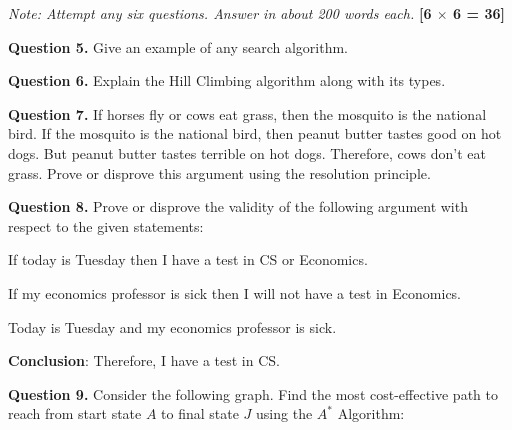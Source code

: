 \documentclass[11pt,a4paper]{article}
\begin{document}
\noindent   \textit{Note: Attempt any six questions. Answer in about 200 words each.} \hfill   \textbf{[6 $ \times$ 6 = 36]}

\medskip


\noindent   \textbf{Question 5.} Give an example of any search algorithm.

\medskip


\noindent   \textbf{Question 6.} Explain the Hill Climbing algorithm along with its types.

\medskip


\noindent   \textbf{Question 7.} If horses fly or cows eat grass, then the mosquito is the national bird. If the mosquito is the national bird, then peanut butter tastes good on hot dogs. But peanut butter tastes terrible on hot dogs. Therefore, cows don't eat grass. Prove or disprove this argument using the resolution principle.

\medskip


\noindent   \textbf{Question 8.} Prove or disprove the validity of the following argument with respect to the given statements:

\begin{parts}
  \item If today is Tuesday then I have a test in CS or Economics.
  \item If my economics professor is sick then I will not have a test in Economics.
  \item Today is Tuesday and my economics professor is sick.
  \item   \textbf{Conclusion}: Therefore, I have a test in CS.
\end{parts}

\medskip


\noindent   \textbf{Question 9.} Consider the following graph. Find the most cost-effective path to reach from start state $A$ to final state $J$ using the $A^*$ Algorithm:
\end{document}
